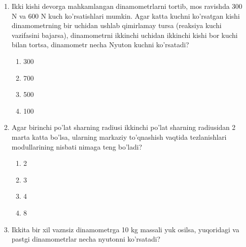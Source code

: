 \begin{enumerate}
\item Ikki kishi devorga mahkamlangan dinamometrlarni tortib, mos ravishda 300 N va 600 N kuch ko'rsatishlari mumkin. Agar katta kuchni ko'rsatgan kishi dinamometrning bir uchidan ushlab qimirlamay tursa (reaksiya kuchi vazifasini bajarsa), dinamometrni ikkinchi uchidan ikkinchi kishi bor kuchi bilan tortsa, dinamometr necha Nyuton kuchni ko'rsatadi?
\begin{enumerate}[label=\Alph*)]
\item 300
\item 700
\item 500
\item 100
\end{enumerate}

\item Agar birinchi po'lat sharning radiusi ikkinchi po'lat sharning radiusidan 2 marta katta bo'lsa, ularning markaziy to'qnashish vaqtida tezlanishlari modullarining nisbati nimaga teng bo'ladi?
\begin{enumerate}[label=\Alph*)]
\item 2
\item 3
\item 4
\item 8
\end{enumerate}

\item Ikkita bir xil vaznsiz dinamometrga 10 kg massali yuk osilsa, yuqoridagi va pastgi dinamometrlar necha nyutonni ko'rsatadi?



\end{enumerate}
